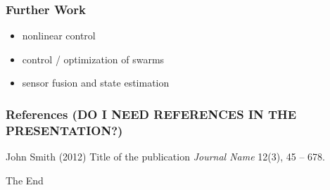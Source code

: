 \documentclass{beamer}
\begin{document}
\begin{frame}
\frametitle{ Further Work }
\begin{itemize}
\item nonlinear control
\item control / optimization of swarms
\item sensor fusion and state estimation
\end{itemize}
\end{frame}





\begin{frame}

\frametitle{References ({\color{red}DO I NEED REFERENCES IN THE PRESENTATION?})}

\footnotesize{
\begin{thebibliography}{99} 
 John Smith (2012)
\newblock Title of the publication
\newblock \emph{Journal Name} 12(3), 45 -- 678.
\end{thebibliography}
}
\end{frame}


\begin{frame}
\Huge{\centerline{The End}}
\end{frame}

\end{document}
